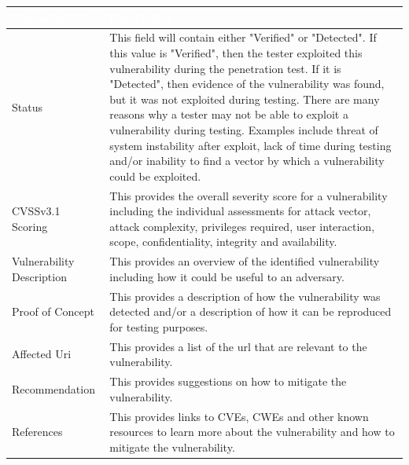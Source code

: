 \documentclass{article}
\begin{document}
            \begin{center}
                \begin{longtable} {|p{8em}|p{30em}|}
                \hline 
                \large \cellcolor{tablecol} \textcolor{white}{\textbf{Characteristics}} & \large \cellcolor{tablecol} \textcolor{white}{\textbf{Description}}   \\    
                \hline
                \normalsize Status & \normalsize This field will contain either "Verified" or "Detected". If this value is "Verified", then the tester exploited this vulnerability during the penetration test. If it is "Detected",
                then evidence of the vulnerability was found, but it was not exploited during testing. There are many reasons why a tester may not be able to exploit a vulnerability
                during testing. Examples include threat of system instability after exploit, lack of time during testing and/or inability to find a vector by which a vulnerability could be exploited.  \\
                \hline
                \normalsize CVSSv3.1 Scoring  & \normalsize This provides the overall severity score for a vulnerability including the individual
                assessments for attack vector, attack complexity, privileges required, user interaction, scope, confidentiality, integrity and availability.  \\
                \hline
                \normalsize Vulnerability Description  & \normalsize This provides an overview of the identified vulnerability including how it could be useful to an adversary. \\
                \hline
                \normalsize Proof of Concept & \normalsize This provides a description of how the vulnerability was detected and/or a description of how it can be reproduced for testing purposes. \\
                \hline
                \normalsize Affected Uri  & \normalsize This provides a list of the url that are relevant to the vulnerability. \\
                \hline
                \normalsize Recommendation & \normalsize This provides suggestions on how to mitigate the vulnerability. \\
                \hline
                \normalsize References & \normalsize This provides links to CVEs, CWEs and other known resources to learn more about the vulnerability and how to mitigate the vulnerability. \\
                \hline
                \end{longtable}   
            \end{center}
            
\end{document}
